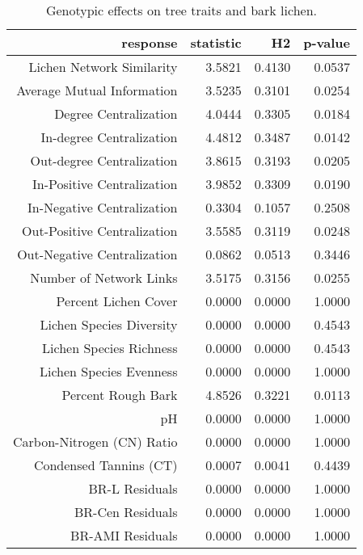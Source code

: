 \begin{table}[ht]
\centering
\begin{tabular}{rrrr}
  \hline
response & statistic & H2 & p-value \\ 
  \hline
Lichen Network Similarity & 3.5821 & 0.4130 & 0.0537 \\ 
  Average Mutual Information & 3.5235 & 0.3101 & 0.0254 \\ 
  Degree Centralization & 4.0444 & 0.3305 & 0.0184 \\ 
  In-degree Centralization & 4.4812 & 0.3487 & 0.0142 \\ 
  Out-degree Centralization & 3.8615 & 0.3193 & 0.0205 \\ 
  In-Positive Centralization & 3.9852 & 0.3309 & 0.0190 \\ 
  In-Negative Centralization & 0.3304 & 0.1057 & 0.2508 \\ 
  Out-Positive Centralization & 3.5585 & 0.3119 & 0.0248 \\ 
  Out-Negative Centralization & 0.0862 & 0.0513 & 0.3446 \\ 
  Number of Network Links & 3.5175 & 0.3156 & 0.0255 \\ 
  Percent Lichen Cover & 0.0000 & 0.0000 & 1.0000 \\ 
  Lichen Species Diversity & 0.0000 & 0.0000 & 0.4543 \\ 
  Lichen Species Richness & 0.0000 & 0.0000 & 0.4543 \\ 
  Lichen Species Evenness & 0.0000 & 0.0000 & 1.0000 \\ 
  Percent Rough Bark & 4.8526 & 0.3221 & 0.0113 \\ 
  pH & 0.0000 & 0.0000 & 1.0000 \\ 
  Carbon-Nitrogen (CN) Ratio & 0.0000 & 0.0000 & 1.0000 \\ 
  Condensed Tannins (CT) & 0.0007 & 0.0041 & 0.4439 \\ 
  BR-L Residuals & 0.0000 & 0.0000 & 1.0000 \\ 
  BR-Cen Residuals & 0.0000 & 0.0000 & 1.0000 \\ 
  BR-AMI Residuals & 0.0000 & 0.0000 & 1.0000 \\ 
   \hline
\end{tabular}
\caption{Genotypic effects on tree traits and bark lichen.} 
\label{tab:h2_table}
\end{table}
